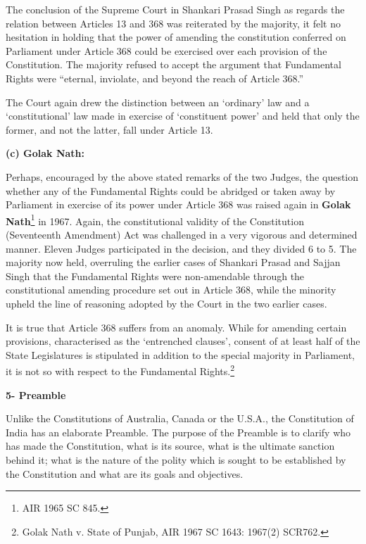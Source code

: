 \begin{multicols}{2}
\vspace{-.15cm}

\noi
The conclusion of the Supreme Court in Shankari Prasad Singh as regards the relation between
Articles 13 and 368 was reiterated by the majority, it felt no hesitation in holding that the power
of amending the constitution conferred on Parliament under Article 368 could be exercised over
each provision of the Constitution. The majority refused to accept the argument that Fundamental
Rights were “eternal, inviolate, and beyond the reach of Article 368.”

\vspace{-.15cm}

\noi
The Court again drew the distinction between an ‘ordinary’ law and a ‘constitutional’ law made in
exercise of ‘constituent power’ and held that only the former, and not the latter, fall under Article 13.

\noi
{\large \bfseries (c) Golak Nath:}

\noi
Perhaps, encouraged by the above stated remarks of the two Judges, the question whether any of
the Fundamental Rights could be abridged or taken away by Parliament in exercise of its power
under Article 368 was raised again in \textbf{Golak Nath}\footnote{AIR 1965 SC 845.} in 1967. Again, the constitutional validity of
the Constitution (Seventeenth Amendment) Act was challenged in a very vigorous and
determined manner. Eleven Judges participated in the decision, and they divided 6 to 5. The
majority now held, overruling the earlier cases of Shankari Prasad and Sajjan Singh that the
Fundamental Rights were non-amendable through the constitutional amending procedure set out
in Article 368, while the minority upheld the line of reasoning adopted by the Court in the two
earlier cases.

\noi
It is true that Article 368 suffers from an anomaly. While for amending certain provisions,
characterised as the ‘entrenched clauses’, consent of at least half of the State Legislatures is
stipulated in addition to the special majority in Parliament, it is not so with respect to the
Fundamental Rights.\footnote{Golak Nath v. State of Punjab, AIR 1967 SC 1643: 1967(2) SCR762.}

\noi
{\large \bfseries 5- Preamble}

\noi
Unlike the Constitutions of Australia, Canada or the U.S.A., the Constitution of India has an
elaborate Preamble. The purpose of the Preamble is to clarify who has made the Constitution,
what is its source, what is the ultimate sanction behind it; what is the nature of the polity which
is sought to be established by the Constitution and what are its goals and objectives.


\end{multicols}
